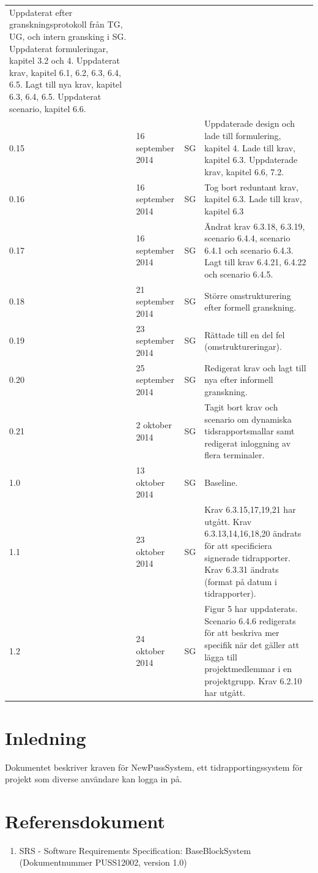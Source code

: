 \documentclass[a4paper]{article}
\begin{document}
\begin{tabular}{ l l l p{8.5cm} }
Uppdaterat efter granskningsprotokoll från TG, UG, och intern gransking i SG.
Uppdaterat formuleringar, kapitel 3.2 och 4. 
Uppdaterat krav, kapitel 6.1, 6.2, 6.3, 6.4, 6.5.
Lagt till nya krav, kapitel 6.3, 6.4, 6.5.
Uppdaterat scenario, kapitel 6.6. \\
0.15 & 16 september 2014 & SG & Uppdaterade design och lade till formulering, kapitel 4.
Lade till krav, kapitel 6.3.
Uppdaterade krav, kapitel 6.6, 7.2.\\
0.16 & 16 september 2014 & SG & Tog bort reduntant krav, kapitel 6.3.
Lade till krav, kapitel 6.3\\
0.17 & 16 september 2014 & SG & Ändrat krav 6.3.18, 6.3.19, scenario 6.4.4, scenario 6.4.1 och scenario 6.4.3. Lagt till krav 6.4.21, 6.4.22 och scenario 6.4.5.\\
0.18 & 21 september 2014 & SG & Större omstrukturering efter formell granskning.
\\
0.19 & 23 september 2014 & SG & Rättade till en del fel (omstruktureringar).
\\
0.20 & 25 september 2014 & SG & Redigerat krav och lagt till nya efter informell granskning.
\\
0.21 & 2 oktober 2014 & SG & Tagit bort krav och scenario om dynamiska tidsrapportsmallar samt redigerat inloggning av flera terminaler.
\\
1.0 & 13 oktober 2014 & SG & Baseline.
\\
1.1 & 23 oktober 2014 & SG & Krav 6.3.15,17,19,21 har utgått. Krav 6.3.13,14,16,18,20 ändrats för att specificiera signerade tidrapporter. Krav 6.3.31 ändrats (format på datum i tidrapporter).
\\
1.2 & 24 oktober 2014 & SG & Figur 5 har uppdaterats. Scenario 6.4.6 redigerats för att beskriva mer specifik när det gäller att lägga till projektmedlemmar i en projektgrupp. Krav 6.2.10 har utgått.
\end{tabular}
\newpage
\section{Inledning}       
Dokumentet beskriver kraven för NewPussSystem, ett tidrapportingssystem för projekt som diverse användare kan logga in på.

\section{Referensdokument}
\begin{enumerate}
\item SRS - Software Requirements Specification: BaseBlockSystem (Dokumentnummer PUSS12002, version 1.0)
\end{enumerate}
\end{document}
